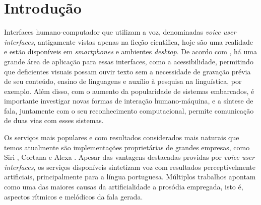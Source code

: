 


\chapter{Introdução}

Interfaces humano-computador que utilizam a voz, denominadas \emph{voice user
  interfaces}, antigamente vistas apenas na ficção científica, hoje são uma
realidade e estão disponíveis em \emph{smartphones} e ambientes \emph{desktop}.
De acordo com , há uma grande área de aplicação
para essas interfaces, como a acessibilidade, permitindo que
deficientes visuais possam ouvir texto sem a necessidade de gravação prévia de
seu conteúdo, ensino de linguagens e auxílio à pesquisa na linguística, por
exemplo. Além disso, com o aumento da popularidade de sistemas embarcados, é
importante investigar novas formas de interação humano-máquina, e a síntese de
fala, juntamente com o seu reconhecimento computacional, permite comunicação de
duas vias com esses sistemas.


Os serviços mais populares e com resultados considerados mais naturais que temos
atualmente são implementações proprietárias de grandes empresas, como Siri
\cite{siri}, Cortana \cite{cortana} e Alexa \cite{alexa}. Apesar das vantagens
destacadas providas por \emph{voice user interfaces}, os serviços
disponíveis sintetizam voz com resultados perceptivelmente artificiais,
principalmente para a língua portuguesa. Múltiplos trabalhos
\cite{hirschberg,prosodysurvey,taylor2009} apontam como uma das maiores causas
da artificialidade a prosódia empregada, isto é, aspectos rítmicos e melódicos
da fala gerada.


